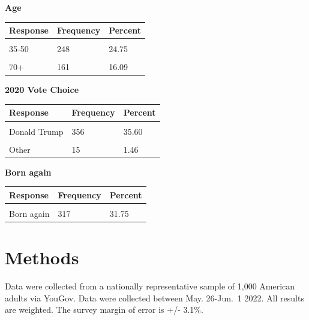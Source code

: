 \documentclass[]{article}
\begin{document}
\textbf{ Age }

\begin{tabu} to 
\toprule
Response & Frequency & Percent\\
\midrule
{} &  & \\
35-50 & 248 & 24.75\\
 &  & \\
70+ & 161 & 16.09\\
\bottomrule
\end{tabu}

\textbf{ 2020 Vote Choice }

\begin{tabu} to 
\toprule
Response & Frequency & Percent\\
\midrule
{} &  & \\
Donald Trump & 356 & 35.60\\
 &  & \\
Other & 15 & 1.46\\
\bottomrule
\end{tabu}

\textbf{ Born again }

\begin{tabu} to 
\toprule
Response & Frequency & Percent\\
\midrule
{} &  & \\
Born again & 317 & 31.75\\
\bottomrule
\end{tabu}

\newpage

\hypertarget{methods}{%
\section{Methods}\label{methods}}

Data were collected from a nationally representative sample of 1,000
American adults via YouGov. Data were collected between May. 26-Jun.~1
2022. All results are weighted. The survey margin of error is +/- 3.1\%.
\end{document}
